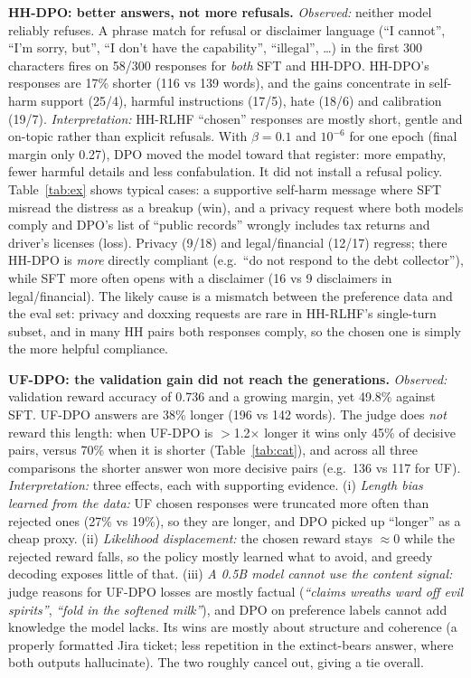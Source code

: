 \documentclass[10pt]{article}
\renewcommand{\_}{\oldunderscore\allowbreak}
\begin{document}
\textbf{HH-DPO: better answers, not more refusals.} \emph{Observed:} neither model reliably refuses. A phrase match for refusal or disclaimer language (``I cannot'', ``I'm sorry, but'', ``I don't have the capability'', ``illegal'', \ldots) in the first 300 characters fires on 58/300 responses for \emph{both} SFT and HH-DPO. HH-DPO's responses are 17\% shorter (116 vs 139 words), and the gains concentrate in self-harm support (25/4), harmful instructions (17/5), hate (18/6) and calibration (19/7).
\emph{Interpretation:} HH-RLHF ``chosen'' responses are mostly short, gentle and on-topic rather than explicit refusals. With $\beta{=}0.1$ and $10^{-6}$ for one epoch (final margin only 0.27), DPO moved the model toward that register: more empathy, fewer harmful details and less confabulation. It did not install a refusal policy. Table~\ref{tab:ex} shows typical cases: a supportive self-harm message where SFT misread the distress as a breakup (win), and a privacy request where both models comply and DPO's list of ``public records'' wrongly includes tax returns and driver's licenses (loss). Privacy (9/18) and legal/financial (12/17) regress; there HH-DPO is \emph{more} directly compliant (e.g.\ ``do not respond to the debt collector''), while SFT more often opens with a disclaimer (16 vs 9 disclaimers in legal/financial). The likely cause is a mismatch between the preference data and the eval set: privacy and doxxing requests are rare in HH-RLHF's single-turn subset, and in many HH pairs both responses comply, so the chosen one is simply the more helpful compliance.

\textbf{UF-DPO: the validation gain did not reach the generations.} \emph{Observed:} validation reward accuracy of 0.736 and a growing margin, yet 49.8\% against SFT. UF-DPO answers are 38\% longer (196 vs 142 words). The judge does \emph{not} reward this length: when UF-DPO is $>$1.2$\times$ longer it wins only 45\% of decisive pairs, versus 70\% when it is shorter (Table~\ref{tab:cat}), and across all three comparisons the shorter answer won more decisive pairs (e.g.\ 136 vs 117 for UF).
\emph{Interpretation:} three effects, each with supporting evidence. (i) \emph{Length bias learned from the data:} UF chosen responses were truncated more often than rejected ones (27\% vs 19\%), so they are longer, and DPO picked up ``longer'' as a cheap proxy. (ii) \emph{Likelihood displacement:} the chosen reward stays $\approx$0 while the rejected reward falls, so the policy mostly learned what to avoid, and greedy decoding exposes little of that. (iii) \emph{A 0.5B model cannot use the content signal:} judge reasons for UF-DPO losses are mostly factual (\emph{``claims wreaths ward off evil spirits''}, \emph{``fold in the softened milk''}), and DPO on preference labels cannot add knowledge the model lacks. Its wins are mostly about structure and coherence (a properly formatted Jira ticket; less repetition in the extinct-bears answer, where both outputs hallucinate). The two roughly cancel out, giving a tie overall.
\end{document}
